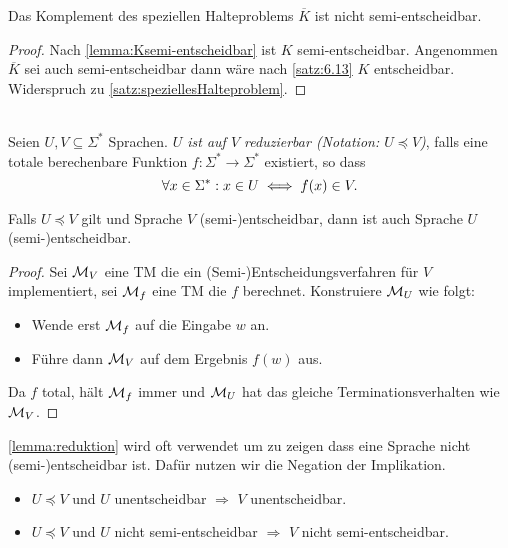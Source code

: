 \begin{Korollar}\label{kor:6.11}
    Das Komplement des speziellen Halteproblems $\overline{K}$
    ist nicht semi-entscheidbar.
\end{Korollar}
\begin{proof}
Nach \autoref{lemma:Ksemi-entscheidbar} ist $K$ semi-entscheidbar. 
Angenommen $\overline{K}$ sei auch semi-entscheidbar dann wäre nach \autoref{satz:6.13} $K$ entscheidbar.
Widerspruch zu \autoref{satz:speziellesHalteproblem}.
\end{proof}


\begin{Def}[Reduktion]\ \\
  Seien $U, V \subseteq \Sigma^*$ Sprachen.
  \emph{$U$ ist auf $V$ reduzierbar (Notation: $U \preceq V$)}, falls eine totale berechenbare Funktion
  $f:\Sigma^* \to \Sigma^*$ existiert, so dass 
  \[
    \forall x \in \Sigma^*:x \in U \iff f(x) \in V. \qedhere
  \]

\end{Def}
\begin{lemma}\label{lemma:reduktion}
  Falls $U \preceq V$ gilt und Sprache $V$ \mbox{(semi-)entscheidbar}, dann ist auch Sprache $U$
  \mbox{(semi-)entscheidbar}.
\end{lemma}
\begin{proof}
  Sei $\mathcal{M}_V$ eine \ac{TM} die ein (Semi-)Entscheidungsverfahren für $V$ implementiert, 
  sei $\mathcal{M}_f$ eine \ac{TM} die $f$ berechnet.
  Konstruiere $\mathcal{M}_U$ wie folgt:
  \begin{itemize}
  \item Wende erst $\mathcal{M}_f$ auf die Eingabe $w$ an.
  \item Führe dann $\mathcal{M}_V$ auf dem Ergebnis $f(w)$ aus.
  \end{itemize}
  Da $f$ total, hält $\mathcal{M}_f$ immer und $\mathcal{M}_U$ hat das gleiche Terminationsverhalten wie $\mathcal{M}_V$.
\end{proof}

\begin{Bemerkung} \autoref{lemma:reduktion} wird oft verwendet um zu zeigen dass eine Sprache nicht \mbox{(semi-)entscheidbar} ist.
Dafür nutzen wir die Negation der Implikation.
\begin{itemize}
 \item $U \preceq V$ und $U$ unentscheidbar $\Rightarrow$ $V$ unentscheidbar.
 \item $U \preceq V$ und $U$ nicht semi-entscheidbar $\Rightarrow$ $V$ nicht semi-entscheidbar.
\end{itemize}
\end{Bemerkung}

